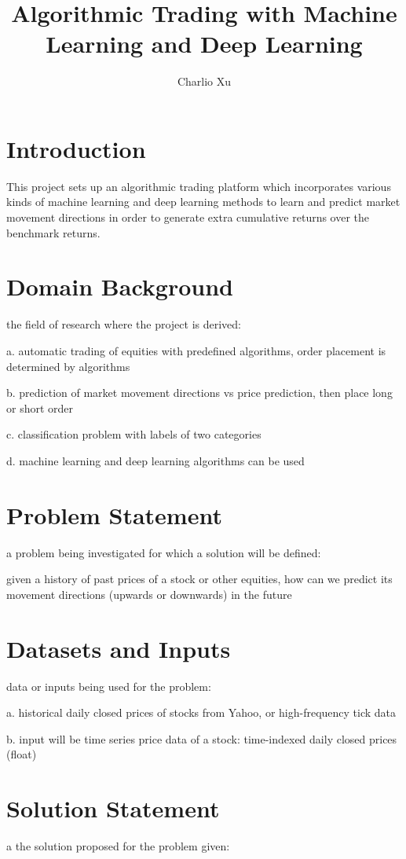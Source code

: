 \documentclass[11pt]{article} %
\title{Algorithmic Trading with Machine Learning and Deep Learning}
\author{Charlio Xu}
\begin{document}
\maketitle

\section{Introduction}
This project sets up an algorithmic trading platform which incorporates various kinds of machine learning and deep learning methods to learn and predict market movement directions in order to generate extra cumulative returns over the benchmark returns.


\section{Domain Background}
the field of research where the project is derived: 

a. automatic trading of equities with predefined algorithms, order placement is determined by algorithms 

b. prediction of market movement directions vs price prediction, then place long or short order

c. classification problem with labels of two categories

d. machine learning and deep learning algorithms can be used




\section{Problem Statement}
a problem being investigated for which a solution will be defined:

given a history of past prices of a stock or other equities, how can we predict its movement directions (upwards or downwards) in the future 


\section{Datasets and Inputs}
data or inputs being used for the problem: 

a. historical daily closed prices of stocks from Yahoo, or high-frequency tick data

b. input will be time series price data of a stock: time-indexed daily closed prices (float)


\section{Solution Statement}
a the solution proposed for the problem given: 
\end{document}
